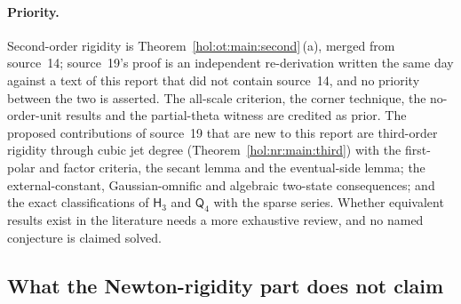 \documentclass[11pt]{article}
\numberwithin{equation}{section}
\theoremstyle{definition}
\theoremstyle{remark}
\begin{document}
\paragraph{Priority.}
Second-order rigidity is Theorem~\ref{hol:ot:main:second}\,(a), merged from
source~14; source~19's proof is an independent re-derivation written the same
day against a text of this report that did not contain source~14, and no
priority between the two is asserted. The
all-scale criterion, the corner technique, the no-order-unit results and the
partial-theta witness are credited as prior. The proposed contributions of
source~19 that are new to this report are third-order rigidity through cubic
jet degree (Theorem~\ref{hol:nr:main:third}) with the first-polar and factor
criteria, the secant lemma and the eventual-side lemma; the external-constant,
Gaussian-omnific and algebraic two-state consequences; and the exact
classifications of $\mathsf H_3$ and $\mathsf Q_4$ with the sparse series.
Whether equivalent results exist in the literature needs a more exhaustive
review, and no named conjecture is claimed solved.

\subsection{What the Newton-rigidity part does not claim}
\label{hol:nr:sub:nonclaims}
\end{document}
